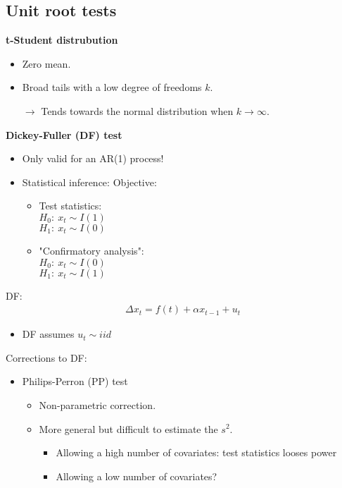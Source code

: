 \begin{multicols}{2}
 \subsection{Unit root tests}
 \textbf{t-Student distrubution}
 \begin{itemize}
  \item Zero mean.
  \item Broad tails with a low degree of freedoms $k$.
  \item[$\rightarrow$] Tends towards the normal distribution when $k\rightarrow\infty$.
 \end{itemize}
 \textbf{Dickey-Fuller (DF) test}
 \begin{itemize}
  \item Only valid for an AR(1) process!
  \item Statistical inference: Objective:
        \begin{itemize}
         \item Test statistics:\\
               $H_0:\ x_t \sim I(1)$\\
               $H_1:\ x_t \sim I(0)$
         \item "Confirmatory analysis":\\
               $H_0:\ x_t \sim I(0)$\\
               $H_1:\ x_t \sim I(1)$
        \end{itemize}
 \end{itemize}
 DF:
 \begin{align*}
  \Delta x_t=f(t)+\alpha x_{t-1}+u_t
 \end{align*}
 \begin{itemize}
   \item DF assumes $u_t\sim iid$
 \end{itemize}
 Corrections to DF:
 \begin{itemize}
  \item Philips-Perron (PP) test
        \begin{itemize}
         \item Non-parametric correction.
         \item More general but difficult to estimate the $s^2$.
         \begin{itemize}
           \item Allowing a high number of covariates: test statistics looses power
           \item Allowing a low number of covariates?
         \end{itemize}

\end{itemize}
\end{itemize}
\end{multicols}
